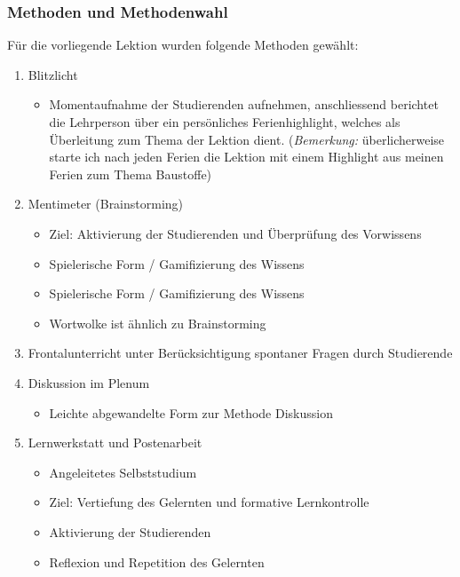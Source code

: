\documentclass[
11pt,
captions=tableheading,
smallheadings,
headsepline,
footsepline, 
captions=tableheading,
parskip=half-,
]{scrartcl}
\begin{document}
\subsubsection{Methoden und Methodenwahl}
Für die vorliegende Lektion wurden folgende Methoden gewählt:

\begin{enumerate}
    \item Blitzlicht
    \begin{itemize}
        \item Momentaufnahme  der Studierenden aufnehmen, anschliessend berichtet die Lehrperson über ein persönliches Ferienhighlight, welches als Überleitung zum Thema der Lektion dient. (\textit{Bemerkung:} überlicherweise starte ich nach jeden Ferien die Lektion mit einem Highlight aus meinen Ferien zum Thema Baustoffe)
    \end{itemize}
    \item Mentimeter (Brainstorming)
    \begin{itemize}
        \item Ziel: Aktivierung der Studierenden und Überprüfung des Vorwissens
        \item Spielerische Form / Gamifizierung des Wissens
        \item Spielerische Form / Gamifizierung des Wissens
        \item Wortwolke ist ähnlich zu Brainstorming
    \end{itemize}
    \item Frontalunterricht unter Berücksichtigung spontaner Fragen durch Studierende
    \item Diskussion im Plenum
    \begin{itemize}
        \item Leichte abgewandelte Form zur Methode Diskussion
    \end{itemize}
    \item Lernwerkstatt und Postenarbeit 
    \begin{itemize}
        \item Angeleitetes  Selbststudium  
        \item Ziel: Vertiefung des Gelernten und formative Lernkontrolle
        \item Aktivierung der Studierenden 
        \item Reflexion und Repetition des Gelernten 
        
    \end{itemize}
\end{enumerate}
\end{document}
